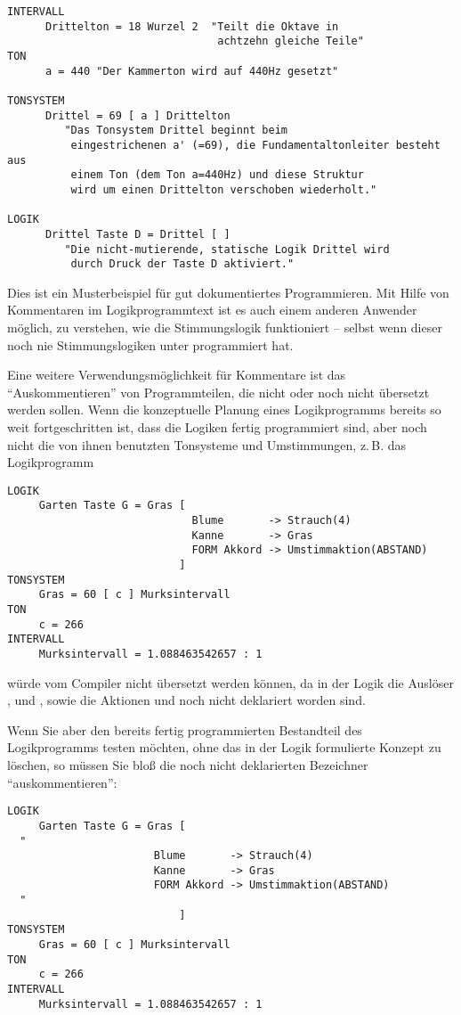 \begin{verbatim}
INTERVALL
      Drittelton = 18 Wurzel 2  "Teilt die Oktave in 
                                 achtzehn gleiche Teile"
TON
      a = 440 "Der Kammerton wird auf 440Hz gesetzt"
     
TONSYSTEM
      Drittel = 69 [ a ] Drittelton
         "Das Tonsystem Drittel beginnt beim
          eingestrichenen a' (=69), die Fundamentaltonleiter besteht aus
          einem Ton (dem Ton a=440Hz) und diese Struktur
          wird um einen Drittelton verschoben wiederholt."

LOGIK
      Drittel Taste D = Drittel [ ]
         "Die nicht-mutierende, statische Logik Drittel wird
          durch Druck der Taste D aktiviert."
\end{verbatim}
Dies ist ein Musterbeispiel für gut dokumentiertes Programmieren. Mit 
Hilfe von Kommentaren im Logikprogrammtext ist es auch einem 
anderen Anwender möglich, zu verstehen, wie die 
Stimmungslogik funktioniert -- selbst wenn dieser 
noch nie Stimmungslogiken unter \mutabor{} programmiert hat.

Eine weitere Verwendungsmöglichkeit für Kommentare ist das 
"`Auskommentieren"' von Programmteilen, die nicht 
oder noch nicht übersetzt werden sollen. Wenn die 
konzeptuelle Planung eines Logikprogramms bereits so weit fortgeschritten 
ist, dass die Logiken fertig programmiert sind, aber noch 
nicht die von ihnen benutzten Tonsysteme und Umstimmungen, z.\,B. das 
Logikprogramm
\begin{verbatim}
LOGIK
     Garten Taste G = Gras [
                             Blume       -> Strauch(4)
                             Kanne       -> Gras
                             FORM Akkord -> Umstimmaktion(ABSTAND)
                           ]
TONSYSTEM 
     Gras = 60 [ c ] Murksintervall
TON
     c = 266
INTERVALL
     Murksintervall = 1.088463542657 : 1
\end{verbatim}
würde vom Compiler nicht übersetzt werden können, da in der Logik 
 die Auslöser ,  und , 
sowie die Aktionen  und  noch 
nicht deklariert worden sind.

Wenn Sie aber den bereits fertig programmierten Bestandteil 
des Logikprogramms testen möchten, ohne das in der Logik 
formulierte Konzept zu löschen, so müssen Sie bloß die noch nicht 
deklarierten Bezeichner "`auskommentieren"':

\begin{verbatim}
LOGIK
     Garten Taste G = Gras [
  "
                       Blume       -> Strauch(4)
                       Kanne       -> Gras
                       FORM Akkord -> Umstimmaktion(ABSTAND)
  "
                           ]
TONSYSTEM 
     Gras = 60 [ c ] Murksintervall
TON
     c = 266
INTERVALL
     Murksintervall = 1.088463542657 : 1
\end{verbatim}

